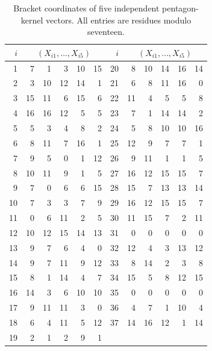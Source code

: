 \begin{table}[!htbp]
\centering\small
\begin{tabular}{r|rrrrr@{\qquad}r|rrrrr}\toprule
$i$&\multicolumn{5}{c}{$(X_{i1},\ldots,X_{i5})$}&$i$&\multicolumn{5}{c}{$(X_{i1},\ldots,X_{i5})$}\\\midrule
1&7&1&3&10&15&20&8&10&14&16&14\\
2&3&10&12&14&1&21&6&8&11&16&0\\
3&15&11&6&15&6&22&11&4&5&5&8\\
4&16&16&12&5&5&23&7&1&14&14&2\\
5&5&3&4&8&2&24&5&8&10&10&16\\
6&8&11&7&16&1&25&12&9&7&7&1\\
7&9&5&0&1&12&26&9&11&1&1&5\\
8&10&11&9&1&5&27&16&12&15&15&7\\
9&7&0&6&6&15&28&15&7&13&13&14\\
10&7&3&3&7&9&29&16&12&15&15&7\\
11&0&6&11&2&5&30&11&15&7&2&11\\
12&10&12&15&14&13&31&0&0&0&0&0\\
13&9&7&6&4&0&32&12&4&3&13&12\\
14&9&7&11&9&12&33&8&14&2&3&8\\
15&8&1&14&4&7&34&15&5&8&12&15\\
16&14&3&6&10&10&35&0&0&0&0&0\\
17&9&11&11&3&0&36&4&7&1&10&4\\
18&6&4&11&5&12&37&14&16&12&1&14\\
19&2&1&2&9&1&&&&&&\\
\bottomrule\end{tabular}
\caption{Bracket coordinates of five independent pentagon-kernel vectors. All entries are residues modulo seventeen.}\label{tab:kernel17}
\end{table}

